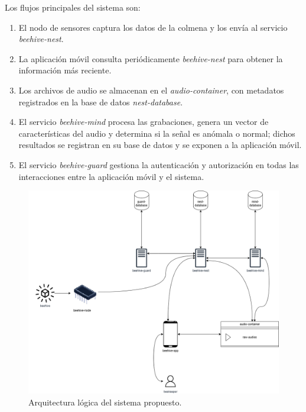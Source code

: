 Los flujos principales del sistema son:
\begin{enumerate}
    \item El nodo de sensores captura los datos de la colmena y los envía al servicio \textit{beehive-nest}.
    \item La aplicación móvil consulta periódicamente \textit{beehive-nest} para obtener la información más reciente.
    \item Los archivos de audio se almacenan en el \textit{audio-container}, con metadatos registrados en la base de datos \textit{nest-database}.
    \item El servicio \textit{beehive-mind} procesa las grabaciones, genera un vector de características del audio y determina si la señal es anómala o normal; dichos resultados se registran en su base de datos y se exponen a la aplicación móvil.
    \item El servicio \textit{beehive-guard} gestiona la autenticación y autorización en todas las interacciones entre la aplicación móvil y el sistema.
\end{enumerate}

\begin{figure}[!ht]
    \centering
    \includegraphics[width=\textwidth]{assets/cap_3/architecture_diagram.png}
    \caption{Arquitectura lógica del sistema propuesto.}
    \label{fig:arquitectura_sistema}
\end{figure}

